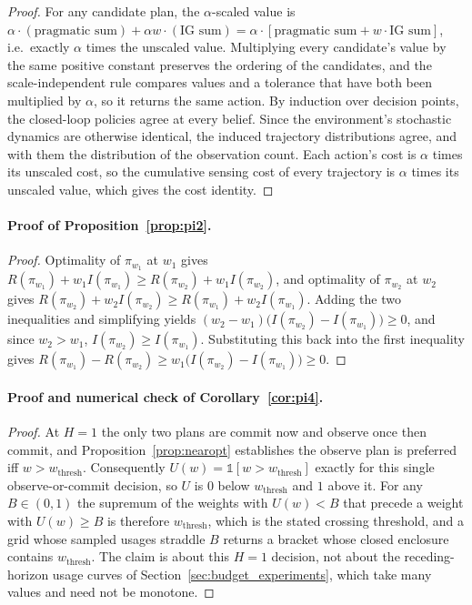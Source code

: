 \begin{proof}
For any candidate plan, the $\alpha$-scaled value is $\alpha \cdot(\text{pragmatic sum}) + \alpha w \cdot (\text{IG sum}) = \alpha \cdot [\text{pragmatic sum} + w \cdot \text{IG sum}]$, i.e.\ exactly $\alpha$ times the unscaled value. Multiplying every candidate's value by the same positive constant preserves the ordering of the candidates, and the scale-independent rule compares values and a tolerance that have both been multiplied by $\alpha$, so it returns the same action. By induction over decision points, the closed-loop policies agree at every belief. Since the environment's stochastic dynamics are otherwise identical, the induced trajectory distributions agree, and with them the distribution of the observation count. Each action's cost is $\alpha$ times its unscaled cost, so the cumulative sensing cost of every trajectory is $\alpha$ times its unscaled value, which gives the cost identity.
\end{proof}

\paragraph{Proof of Proposition~\ref{prop:pi2}.}

\begin{proof}
Optimality of $\pi_{w_1}$ at $w_1$ gives $R(\pi_{w_1}) + w_1 I(\pi_{w_1}) \ge R(\pi_{w_2}) + w_1 I(\pi_{w_2})$, and optimality of $\pi_{w_2}$ at $w_2$ gives $R(\pi_{w_2}) + w_2 I(\pi_{w_2}) \ge R(\pi_{w_1}) + w_2 I(\pi_{w_1})$. Adding the two inequalities and simplifying yields $(w_2 - w_1)\big(I(\pi_{w_2}) - I(\pi_{w_1})\big) \ge 0$, and since $w_2 > w_1$, $I(\pi_{w_2}) \ge I(\pi_{w_1})$. Substituting this back into the first inequality gives $R(\pi_{w_1}) - R(\pi_{w_2}) \ge w_1\big(I(\pi_{w_2}) - I(\pi_{w_1})\big) \ge 0$.
\end{proof}

\paragraph{Proof and numerical check of Corollary~\ref{cor:pi4}.}

\begin{proof}
At $H{=}1$ the only two plans are commit now and observe once then commit, and Proposition~\ref{prop:nearopt} establishes the observe plan is preferred iff $w > w_{\mathrm{thresh}}$. Consequently $U(w) = \mathbb{1}[w > w_{\mathrm{thresh}}]$ exactly for this single observe-or-commit decision, so $U$ is $0$ below $w_{\mathrm{thresh}}$ and $1$ above it. For any $B \in (0,1)$ the supremum of the weights with $U(w) < B$ that precede a weight with $U(w) \ge B$ is therefore $w_{\mathrm{thresh}}$, which is the stated crossing threshold, and a grid whose sampled usages straddle $B$ returns a bracket whose closed enclosure contains $w_{\mathrm{thresh}}$. The claim is about this $H{=}1$ decision, not about the receding-horizon usage curves of Section~\ref{sec:budget_experiments}, which take many values and need not be monotone.
\end{proof}

